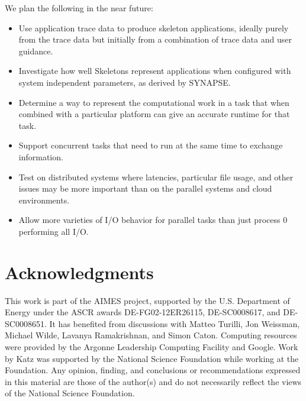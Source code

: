 \documentclass[preprint,12pt]{elsarticle}
\newcommand{\katznote}[1]{ {\textcolor{blue}    { ***Dan:   #1 }}}
\newcommand{\zhaonote}[1]{{\textcolor{darkgreen}{ ***Zhao:  #1 }}}
\newcommand{\katznote}[1]{}
\newcommand{\zhaonote}[1]{}
\begin{document}
We plan the following in the near future:
\begin{itemize}
\item {} Use application trace data to produce skeleton applications, ideally purely from the trace data but initially from a combination of trace data and user guidance.
\item {} Investigate how well Skeletons represent applications when
    configured with system independent parameters, as derived by SYNAPSE.
\item {} Determine a way to represent the computational work in a task that when combined with a particular platform can give an accurate runtime for that task.
\item {} Support concurrent tasks that need to run at the same time to exchange information.
\item {} Test on distributed systems where latencies, particular file usage, and other issues may be more important than on the parallel systems and cloud environments.
\item {} Allow more varieties of I/O behavior for parallel tasks than just process 0 performing all I/O.
\end{itemize}

\section*{Acknowledgments}

This work is part of the AIMES project, supported by the U.S. Department of Energy 
under the ASCR awards DE-FG02-12ER26115,
DE-SC0008617, and DE-SC0008651.
It has benefited from discussions with Matteo Turilli, Jon Weissman, Michael Wilde, Lavanya Ramakrishnan, and Simon Caton.
Computing resources were provided by the
Argonne Leadership Computing Facility and Google. Work by Katz was supported by 
the National Science Foundation while working at the Foundation.  Any 
opinion, finding, and conclusions or recommendations expressed in this
 material are those of the author(s) and do not necessarily reflect 
 the views of the National Science Foundation.
 
\end{document}
